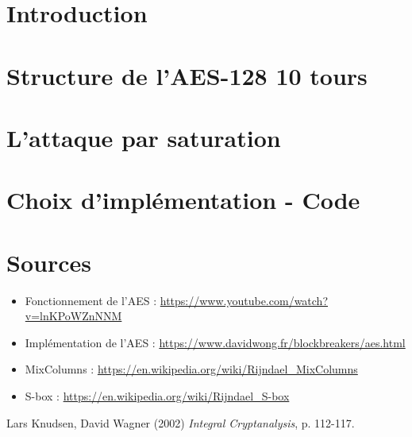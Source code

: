 \documentclass{article}
\begin{document}
    \thispagestyle{empty}
    

    \newpage
    
    \thispagestyle{empty}
    \tableofcontents

    \newpage

    \setcounter{page}{1}
    \section{Introduction}
    

    \vspace{1 cm}

    \section{Structure de l'AES-128 10 tours}
    

    \vspace{1 cm}

    \section{L'attaque par saturation}
    

    \vspace{1 cm}

	\section{Choix d'implémentation - Code}
	
	
	\newpage

    \thispagestyle{empty}
    \section{Sources}
    \begin{itemize}
        \item Fonctionnement de l'AES : \url{https://www.youtube.com/watch?v=lnKPoWZnNNM}
        \item Implémentation de l'AES :
        \url{https://www.davidwong.fr/blockbreakers/aes.html}
        \item MixColumns :
        \url{https://en.wikipedia.org/wiki/Rijndael_MixColumns}
        \item S-box :
        \url{https://en.wikipedia.org/wiki/Rijndael_S-box}
    \end{itemize}

    \vspace{0.5 cm}

	\begin{thebibliography}{1}
		Lars Knudsen, David Wagner (2002) \textit{Integral Cryptanalysis}, p. 112-117.
	\end{thebibliography}
\end{document}
